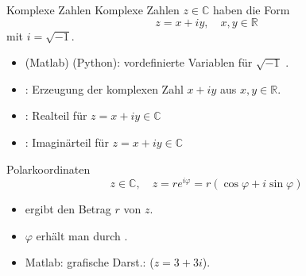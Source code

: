 \documentclass[hyperref={xetex}]{beamer}
\begin{document}
%
%
\begin{frame}[fragile]{Komplexe Zahlen}
Komplexe Zahlen $z \in \mathbb{C}$ haben die Form
\[ z = x +iy, \quad x,y \in \mathbb{R} \]
mit $i=\sqrt{-1}$. 
\begin{itemize}
  \item {}(Matlab) (Python): vordefinierte Variablen für $\sqrt{-1}$ .
\item {}: Erzeugung der komplexen Zahl $x + iy$ aus $x,y \in
  \mathbb{R}$.
\item {}: Realteil für $z=x+iy \in \mathbb{C}$ 
\item {}: Imaginärteil für $z=x+iy \in \mathbb{C}$
\end{itemize} 
\end{frame}
\begin{frame}[fragile]{Polarkoordinaten}
\alert{ \[ z \in \mathbb{C}, \quad z=re^{i \varphi}=r(\cos \varphi + i \sin
  \varphi) \]}
\begin{itemize}
\item {} ergibt den Betrag $r$ von $z$.
\item $\varphi$ erhält man durch .
\item Matlab: grafische Darst.:   ($z=3+3i$). \\
 \\ 
\end{itemize}
\end{frame}
\end{document}
